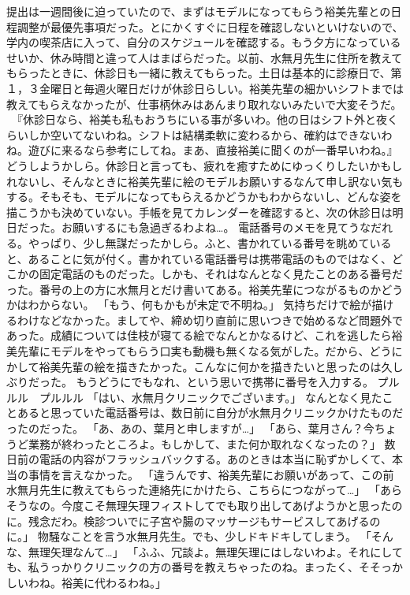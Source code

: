 提出は一週間後に迫っていたので、まずはモデルになってもらう裕美先輩との日程調整が最優先事項だった。とにかくすぐに日程を確認しないといけないので、学内の喫茶店に入って、自分のスケジュールを確認する。もう夕方になっているせいか、休み時間と違って人はまばらだった。以前、水無月先生に住所を教えてもらったときに、休診日も一緒に教えてもらった。土日は基本的に診療日で、第１，３金曜日と毎週火曜日だけが休診日らしい。裕美先輩の細かいシフトまでは教えてもらえなかったが、仕事柄休みはあんまり取れないみたいで大変そうだ。
　『休診日なら、裕美も私もおうちにいる事が多いわ。他の日はシフト外と夜くらいしか空いてないわね。シフトは結構柔軟に変わるから、確約はできないわね。遊びに来るなら参考にしてね。まあ、直接裕美に聞くのが一番早いわね。』
どうしようかしら。休診日と言っても、疲れを癒すためにゆっくりしたいかもしれないし、そんなときに裕美先輩に絵のモデルお願いするなんて申し訳ない気もする。そもそも、モデルになってもらえるかどうかもわからないし、どんな姿を描こうかも決めていない。手帳を見てカレンダーを確認すると、次の休診日は明日だった。お願いするにも急過ぎるわよね…。
電話番号のメモを見てうなだれる。やっぱり、少し無謀だったかしら。ふと、書かれている番号を眺めていると、あることに気が付く。書かれている電話番号は携帯電話のものではなく、どこかの固定電話のものだった。しかも、それはなんとなく見たことのある番号だった。番号の上の方に水無月とだけ書いてある。裕美先輩につながるものかどうかはわからない。
「もう、何もかもが未定で不明ね。」
気持ちだけで絵が描けるわけなどなかった。ましてや、締め切り直前に思いつきで始めるなど問題外であった。成績については佳枝が寝てる絵でなんとかなるけど、これを逃したら裕美先輩にモデルをやってもらう口実も動機も無くなる気がした。だから、どうにかして裕美先輩の絵を描きたかった。こんなに何かを描きたいと思ったのは久しぶりだった。
もうどうにでもなれ、という思いで携帯に番号を入力する。
プルルル　プルルル
「はい、水無月クリニックでございます。」
なんとなく見たことあると思っていた電話番号は、数日前に自分が水無月クリニックかけたものだったのだった。
「あ、あの、葉月と申しますが…」
「あら、葉月さん？今ちょうど業務が終わったところよ。もしかして、また何か取れなくなったの？」
数日前の電話の内容がフラッシュバックする。あのときは本当に恥ずかしくて、本当の事情を言えなかった。
「違うんです、裕美先輩にお願いがあって、この前水無月先生に教えてもらった連絡先にかけたら、こちらにつながって…」
「あらそうなの。今度こそ無理矢理フィストしてでも取り出してあげようかと思ったのに。残念だわ。検診ついでに子宮や腸のマッサージもサービスしてあげるのに。」
物騒なことを言う水無月先生。でも、少しドキドキしてしまう。
「そんな、無理矢理なんて…」
「ふふ、冗談よ。無理矢理にはしないわよ。それにしても、私うっかりクリニックの方の番号を教えちゃったのね。まったく、そそっかしいわね。裕美に代わるわね。」
